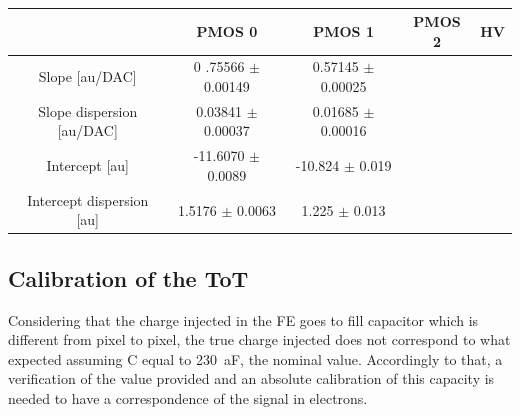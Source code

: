         \begin{table}
            \begin{center}
            \begin{tabular}{| c |  c | c | c |c |}
            \hline
            & PMOS 0 & PMOS 1 & PMOS 2 & HV \\
            \hline
            \hline
            Slope [au/DAC] & 0 .75566 $\pm$ 0.00149 & 0.57145 $\pm$ 0.00025 \\
            Slope dispersion [au/DAC] & 0.03841 $\pm$ 0.00037 & 0.01685 $\pm$ 0.00016\\
            Intercept [au] & -11.6070 $\pm$ 0.0089 & -10.824 $\pm$ 0.019 \\
            Intercept dispersion [au] & 1.5176 $\pm$ 0.0063 & 1.225 $\pm$ 0.013\\
            \hline
            \end{tabular}
            \caption{}
            \label{tab:}
            \end{center}
        \end{table}        

        \subsection{Calibration of the ToT}
        Considering that the charge injected in the FE goes to fill capacitor which is different from pixel to pixel, the true charge injected does not correspond to what expected assuming C equal to \SI{230}{aF}, the nominal value. 
        Accordingly to that, a verification of the value provided and an absolute calibration of this capacity is needed to have a correspondence of the signal in electrons. 

